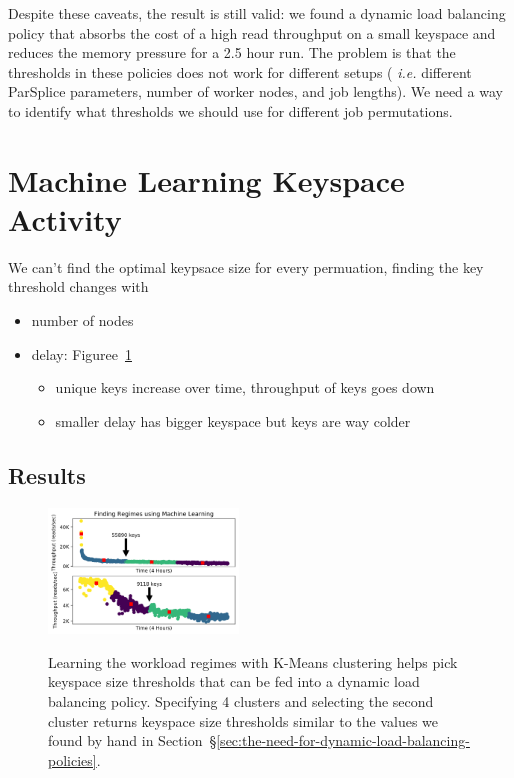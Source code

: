 Despite these caveats, the result is still valid: we found a dynamic load
balancing policy that absorbs the cost of a high read throughput on a small
keyspace and reduces the memory pressure for a 2.5 hour run. The problem is
that the thresholds in these policies does not work for different setups ({\it
i.e.} different ParSplice parameters, number of worker nodes, and job lengths).
We need a way to identify what thresholds we should use for different job
permutations.

\section{Machine Learning Keyspace Activity}

We can't find the optimal keypsace size for every permuation, finding the key threshold changes with
\begin{itemize}
  \item number of nodes
  \item delay: Figuree~\ref{fig:futurework-regimes}
  \begin{itemize}
    \item unique keys increase over time, throughput of keys goes down
    \item smaller delay has bigger keyspace but keys are way colder 
  \end{itemize}
\end{itemize}


\subsection*{Results}

\begin{figure}[tbh]
\noindent\includegraphics[width=0.45\textwidth]{figures/futurework-regimes.png}\\
\caption{Learning the workload regimes with K-Means clustering helps pick
keyspace size thresholds that can be fed into a dynamic load balancing policy.
Specifying 4 clusters and selecting the second cluster returns keyspace size
thresholds similar to the values we found by hand in
Section~\S\ref{sec:the-need-for-dynamic-load-balancing-policies}.
\label{fig:futurework-regimes}}
\end{figure}


